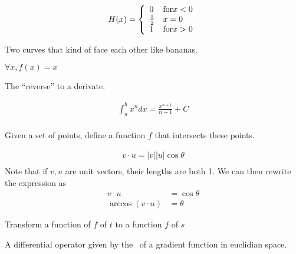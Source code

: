 \begin{definition}
    $$
    H(x) = \left\{
            \begin{array}{l l}
                0 & \text{for} x < 0 \\
                \frac{1}{2} & x = 0 \\
                1 & \text{for} x > 0 \\
            \end{array}
        \right.
    $$
\end{definition}

\begin{definition}[Hyperbolic]
    Two curves that kind of face each other like bananas.
\end{definition}

\begin{definition}
    $\forall{x}, f(x) = x$
\end{definition}

\begin{definition}[Integral]
    The ``reverse'' to a derivate. 

    \begin{align}
        \int_{a}^{b}x^{n} dx = \frac{x^{n+1}}{n+1} + C \\
    \end{align}

\end{definition}

\begin{definition}
    Given a set of points, define a function $f$ that intersects these points.
\end{definition}

\begin{definition}
    \begin{align*}
        v \cdot u = |v||u|\cos{\theta} \\
    \end{align*}
    Note that if $v, u$ are unit vectors, their lengths are both 1.
    We can then rewrite the expression as
    \begin{align*}
        v \cdot u &= \cos{\theta} \\
        \arccos{(v \cdot u)} &= \theta
    \end{align*}
\end{definition}

\begin{definition}
    Transform a function of $f$ of $t$ to a function $f$ of $s$

    A differential operator given by the~ of a gradient 
    function in euclidian space.
\end{definition}


